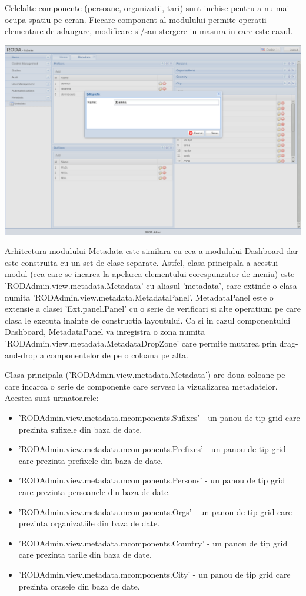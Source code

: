 Celelalte componente (persoane, organizatii, tari) sunt inchise pentru a nu mai ocupa spatiu pe ecran. Fiecare component al modulului permite operatii elementare de adaugare, modificare si/sau stergere in masura in care este cazul.

\includegraphics[width=16cm]{img/metadata-form}


Arhitectura modulului Metadata este similara cu cea a modulului Dashboard dar este construita cu un set de clase separate. Astfel, clasa principala a acestui modul (cea care se incarca la apelarea elementului corespunzator de meniu) este 'RODAdmin.view.metadata.Metadata' cu aliasul 'metadata', care extinde o clasa numita 'RODAdmin.view.metadata.MetadataPanel'. MetadataPanel este o extensie a clasei 'Ext.panel.Panel' cu o serie de verificari si alte operatiuni pe care clasa le executa inainte de constructia layoutului. Ca si in cazul componentului Dashboard, MetadataPanel va inregistra o zona numita 'RODAdmin.view.metadata.MetadataDropZone' care permite mutarea prin drag-and-drop a componentelor de pe o coloana pe alta.  

Clasa principala ('RODAdmin.view.metadata.Metadata') are doua coloane pe care incarca o serie de componente care servesc la vizualizarea metadatelor. Acestea sunt urmatoarele: 

\begin{itemize}
\item 'RODAdmin.view.metadata.mcomponents.Sufixes' - un panou de tip grid care prezinta sufixele din baza de date.
\item 'RODAdmin.view.metadata.mcomponents.Prefixes' - un panou de tip grid care prezinta prefixele din baza de date.
\item 'RODAdmin.view.metadata.mcomponents.Persons' - un panou de tip grid care prezinta persoanele din baza de date.
\item 'RODAdmin.view.metadata.mcomponents.Orgs' - un panou de tip grid care prezinta organizatiile din baza de date.
\item 'RODAdmin.view.metadata.mcomponents.Country' - un panou de tip grid care prezinta tarile din baza de date.
\item 'RODAdmin.view.metadata.mcomponents.City' - un panou de tip grid care prezinta orasele din baza de date.
\end{itemize}

